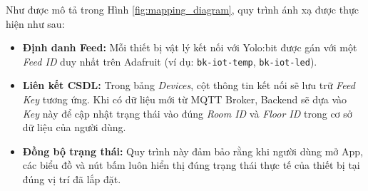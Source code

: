 Như được mô tả trong Hình \ref{fig:mapping_diagram}, quy trình ánh xạ được thực hiện như sau:
\begin{itemize}
    \item \textbf{Định danh Feed:} Mỗi thiết bị vật lý kết nối với Yolo:bit được gán với một \textit{Feed ID} duy nhất trên Adafruit (ví dụ: \texttt{bk-iot-temp}, \texttt{bk-iot-led}).
    \item \textbf{Liên kết CSDL:} Trong bảng \textit{Devices}, cột thông tin kết nối sẽ lưu trữ \textit{Feed Key} tương ứng. Khi có dữ liệu mới từ MQTT Broker, Backend sẽ dựa vào \textit{Key} này để cập nhật trạng thái vào đúng \textit{Room ID} và \textit{Floor ID} trong cơ sở dữ liệu của người dùng.
    \item \textbf{Đồng bộ trạng thái:} Quy trình này đảm bảo rằng khi người dùng mở App, các biểu đồ và nút bấm luôn hiển thị đúng trạng thái thực tế của thiết bị tại đúng vị trí đã lắp đặt.
\end{itemize}


